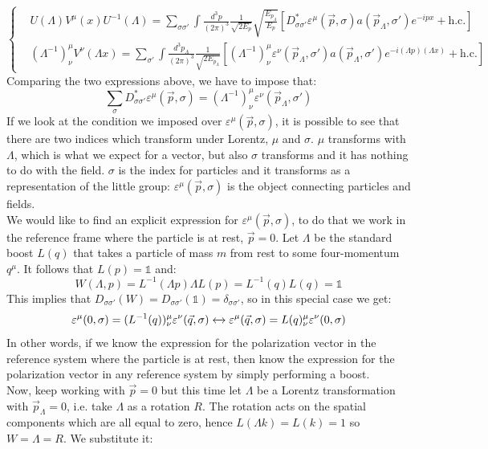 \documentclass[../main.tex]{subfiles}
\begin{document}
\[
\left\{
\begin{aligned}
&U(\Lambda)V^\mu(x)U^{-1}(\Lambda)=\sum_{\sigma\sigma'}\int\frac{d^3p}{(2\pi)^3}\frac{1}{\sqrt{2E_p}}\sqrt{\frac{E_{p_\Lambda}}{E_p}}\left[D_{\sigma\sigma'}^*\varepsilon^\mu(\vec{p},\sigma)a(\vec{p}_\Lambda,\sigma')e^{-ipx}+\text{h.c.}\right]\\
&(\Lambda^{-1})^\mu_\nu V^\nu(\Lambda x)=\sum_{\sigma'}\int\frac{d^3p_\Lambda}{(2\pi)^3}\frac{1}{\sqrt{2E_{p_\Lambda}}}[(\Lambda^{-1})^\mu_\nu\varepsilon^\nu(\Vec{p}_\Lambda,\sigma')a(\Vec{p}_\Lambda,\sigma')e^{-i(\Lambda p)(\Lambda x)}+\text{h.c.}]
\end{aligned}
\right.
\]
Comparing the two expressions above, we have to impose that:
\[
\sum_\sigma D_{\sigma\sigma'}^*\varepsilon^\mu(\vec{p},\sigma)=(\Lambda^{-1})^\mu_\nu\varepsilon^\nu(\vec{p}_\Lambda,\sigma')
\]
If we look at the condition we imposed over $\varepsilon^\mu(\vec{p},\sigma)$, it is possible to see that there are two indices which transform under Lorentz, $\mu$ and $\sigma$. $\mu$ transforms with $\Lambda$, which is what we expect for a vector, but also $\sigma$ transforms and it has nothing to do with the field. $\sigma$ is the index for particles and it transforms as a representation of the little group: $\varepsilon^\mu(\vec{p},\sigma)$ is the object connecting particles and fields.\\
We would like to find an explicit expression for $\varepsilon^\mu(\vec{p},\sigma)$, to do that we work in the reference frame where the particle is at rest, $\Vec{p}=0$. Let $\Lambda$ be the standard boost $L(q)$ that takes a particle of mass $m$ from rest to some four-momentum $q^\mu$. It follows that $L(p)=\mathbb{1}$ and:
\[
W(\Lambda,p)=L^{-1}(\Lambda p)\Lambda L(p)=L^{-1}(q)L(q)=\mathbb{1}
\]
This implies that $D_{\sigma\sigma'}(W)=D_{\sigma\sigma'}(\mathbb{1})=\delta_{\sigma\sigma'}$, so in this special case we get:
\[
\varepsilon^\mu(0,\sigma)=(L^{-1}(q))^\mu_\nu\varepsilon^\nu(\vec{q},\sigma)\xleftrightarrow[]{}\varepsilon^\mu(\vec{q},\sigma)=L(q)^\mu_\nu\varepsilon^\nu(0,\sigma)
\]
In other words, if we know the expression for the polarization vector in the reference system where the particle is at rest, then know the expression for the polarization vector in any reference system by simply performing a boost.\\
Now, keep working with $\Vec{p}=0$ but this time let $\Lambda$ be a Lorentz transformation with $\Vec{p}_\Lambda=0$, i.e. take $\Lambda$ as a rotation $R$. The rotation acts on the spatial components which are all equal to zero, hence $L(\Lambda k)=L(k)=1$ so $W=\Lambda=R$. We substitute it:
\end{document}
